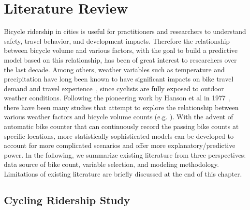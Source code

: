 \documentclass [11pt, proquest] {uwthesis}[2015/03/03]
\begin{document}
 
 
\chapter{Literature Review}

Bicycle ridership in cities is useful for practitioners and researchers to understand safety, travel behavior, and development impacts. Therefore the relationship between bicycle volume and various factors, with the goal to build a predictive model based on this relationship, has been of great interest to researchers over the last decade. Among others, weather variables such as temperature and precipitation have long been known to have significant impacts on bike travel demand and travel experience~\cite{Guo07}, since cyclists are fully exposed to outdoor weather conditions. Following the pioneering work by Hanson et al in 1977~\cite{Hanson77}, there have been many studies that attempt to explore the relationship between various weather factors and bicycle volume counts (e.g. \cite{Griswold:2011aa,Fields:2012aa,Niemeier:1996aa,Nosal:2014aa, PeterWeiran16}). With the advent of automatic bike counter that can continuously record the passing bike counts at specific locations, more statistically sophisticated models can be developed to account for more complicated scenarios and offer more explanatory/predictive power. In the following, we summarize existing literature from three perspectives: data source of bike count, variable selection, and modeling methodology. Limitations of existing literature are briefly discussed at the end of this chapter.

\section{Cycling Ridership Study}
\end{document}
